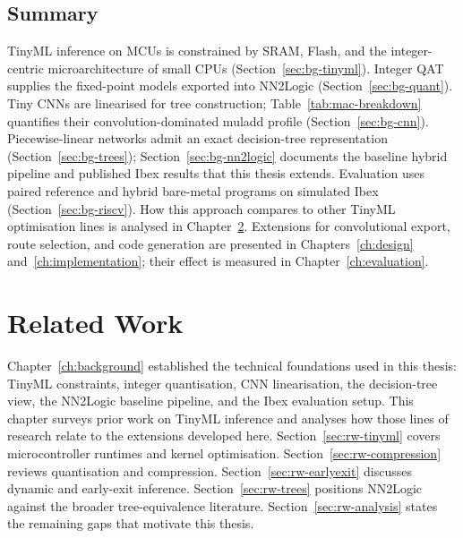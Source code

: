 \section{Summary}
\label{sec:bg-summary}

TinyML inference on \acp{MCU} is constrained by \ac{SRAM}, Flash, and the integer-centric microarchitecture of small \acp{CPU} (Section~\ref{sec:bg-tinyml}).
Integer \ac{QAT} supplies the fixed-point models exported into NN2Logic (Section~\ref{sec:bg-quant}).
Tiny \acp{CNN} are linearised for tree construction; Table~\ref{tab:mac-breakdown} quantifies their convolution-dominated muladd profile (Section~\ref{sec:bg-cnn}).
Piecewise-linear networks admit an exact decision-tree representation (Section~\ref{sec:bg-trees}); Section~\ref{sec:bg-nn2logic} documents the baseline hybrid pipeline and published Ibex results that this thesis extends.
Evaluation uses paired reference and hybrid bare-metal programs on simulated Ibex (Section~\ref{sec:bg-riscv}).
How this approach compares to other TinyML optimisation lines is analysed in Chapter~\ref{ch:relatedwork}.
Extensions for convolutional export, route selection, and code generation are presented in Chapters~\ref{ch:design} and~\ref{ch:implementation}; their effect is measured in Chapter~\ref{ch:evaluation}.


\chapter{Related Work}
\label{ch:relatedwork}

Chapter~\ref{ch:background} established the technical foundations used in this thesis: TinyML constraints, integer quantisation, \ac{CNN} linearisation, the decision-tree view, the NN2Logic baseline pipeline, and the Ibex evaluation setup.
This chapter surveys prior work on TinyML inference and analyses how those lines of research relate to the extensions developed here.
Section~\ref{sec:rw-tinyml} covers microcontroller runtimes and kernel optimisation.
Section~\ref{sec:rw-compression} reviews quantisation and compression.
Section~\ref{sec:rw-earlyexit} discusses dynamic and early-exit inference.
Section~\ref{sec:rw-trees} positions NN2Logic against the broader tree-equivalence literature.
Section~\ref{sec:rw-analysis} states the remaining gaps that motivate this thesis.


